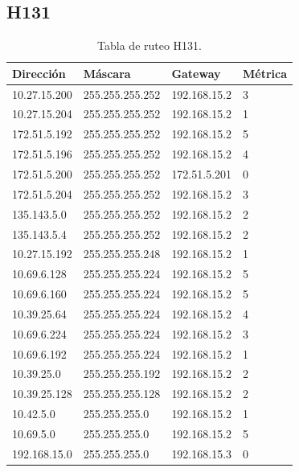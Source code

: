 \documentclass[12pt,titlepage]{article}
\begin{document}
\subsection{H131}
\begin{table}
  \begin{center}
    \begin{tabular}{|l|l|l|l|}
      \hline
        \bf{Direcci\'on} & \bf{M\'ascara} & \bf{Gateway} & \bf{M\'etrica} \\
      \hline 
	10.27.15.200  & 255.255.255.252 & 192.168.15.2 & 3 \\
        10.27.15.204  & 255.255.255.252 & 192.168.15.2 & 1 \\
        172.51.5.192  & 255.255.255.252 & 192.168.15.2 & 5 \\
        172.51.5.196  & 255.255.255.252 & 192.168.15.2 & 4 \\
        172.51.5.200  & 255.255.255.252 & 172.51.5.201 & 0 \\
        172.51.5.204  & 255.255.255.252 & 192.168.15.2 & 3 \\
        135.143.5.0   & 255.255.255.252 & 192.168.15.2 & 2 \\
        135.143.5.4   & 255.255.255.252 & 192.168.15.2 & 2 \\ 	
	10.27.15.192  & 255.255.255.248 & 192.168.15.2 & 1 \\
	10.69.6.128   & 255.255.255.224 & 192.168.15.2 & 5 \\
        10.69.6.160   & 255.255.255.224 & 192.168.15.2 & 5 \\
	10.39.25.64   & 255.255.255.224 & 192.168.15.2 & 4 \\       
	10.69.6.224   & 255.255.255.224 & 192.168.15.2 & 3 \\
	10.69.6.192   & 255.255.255.224 & 192.168.15.2 & 1 \\	
	10.39.25.0    & 255.255.255.192 & 192.168.15.2 & 2 \\
	10.39.25.128  & 255.255.255.128 & 192.168.15.2 & 2 \\
	10.42.5.0     & 255.255.255.0 & 192.168.15.2 & 1 \\
        10.69.5.0     & 255.255.255.0 & 192.168.15.2 & 5 \\
        192.168.15.0  & 255.255.255.0 & 192.168.15.3 & 0 \\  
    \hline
    \end{tabular} \\
  \end{center}
  \caption{Tabla de ruteo H131.}
\end{table}
\newpage
\end{document}
